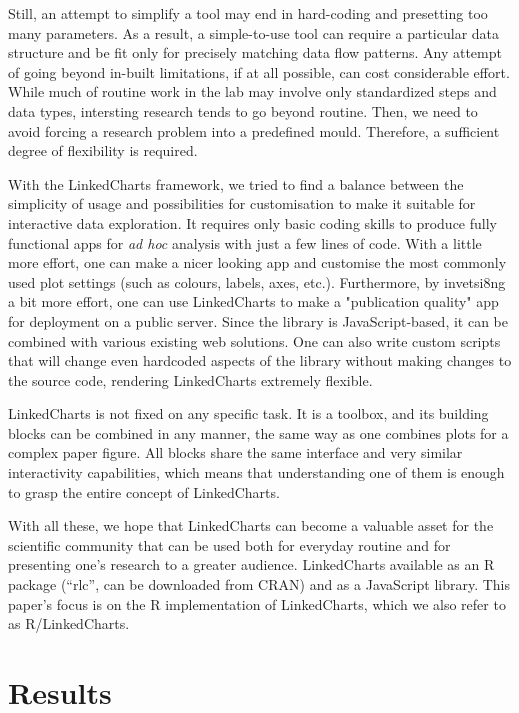 \documentclass[twocolumn,10pt]{article}
\begin{document}
Still, an attempt to simplify a tool may end in hard-coding and presetting too many parameters. As a result, a simple-to-use tool can require a particular data structure and be fit only for precisely matching data flow patterns. Any attempt of going beyond in-built limitations, if at all possible, can cost considerable effort. While much of routine work in the lab may involve only standardized steps and data types, intersting research tends to go beyond routine. Then, we need to avoid forcing a research problem into a predefined mould. Therefore, a sufficient degree of flexibility is required.

With the LinkedCharts framework, we tried to find a balance between the simplicity of usage and possibilities for customisation to make it suitable for interactive data exploration. It requires only basic coding skills to produce fully functional apps for \emph{ad hoc} analysis with just a few lines of code. With a little more effort, one can make a nicer looking app and customise the most commonly used plot settings (such as colours, labels, axes, etc.). Furthermore, by invetsi8ng a bit more effort, one can use LinkedCharts to make a "publication quality" app for deployment on a public server. Since the library is JavaScript-based, it can be combined with various existing web solutions. One can also write custom scripts that will change even hardcoded aspects of the library without making changes to the source code, rendering LinkedCharts extremely flexible. 

LinkedCharts is not fixed on any specific task. It is a toolbox, and its building blocks can be combined in any manner, the same way as one combines plots for a complex paper figure. All blocks share the same interface and very similar interactivity capabilities, which means that understanding one of them is enough to grasp the entire concept of LinkedCharts.

With all these, we hope that LinkedCharts can become a valuable asset for the scientific community that can be used both for everyday routine and for presenting one's research to a greater audience. LinkedCharts available as an R package (``rlc'', can be downloaded from CRAN) and as a JavaScript library. This paper's focus is on the R implementation of LinkedCharts, which we also refer to as R/LinkedCharts. 

\section{Results}
\end{document}
